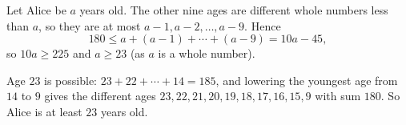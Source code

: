 Let Alice be $a$ years old. The other nine ages are different whole numbers less than $a$, so they are at most $a-1,a-2,\dots,a-9$. Hence
\[
180\le a+(a-1)+\cdots+(a-9)=10a-45,
\]
so $10a\ge225$ and $a\ge23$ (as $a$ is a whole number).

Age $23$ is possible: $23+22+\cdots+14=185$, and lowering the youngest age from $14$ to $9$ gives the different ages $23,22,21,20,19,18,17,16,15,9$ with sum $180$. So Alice is at least $\boxed{23}$ years old.
